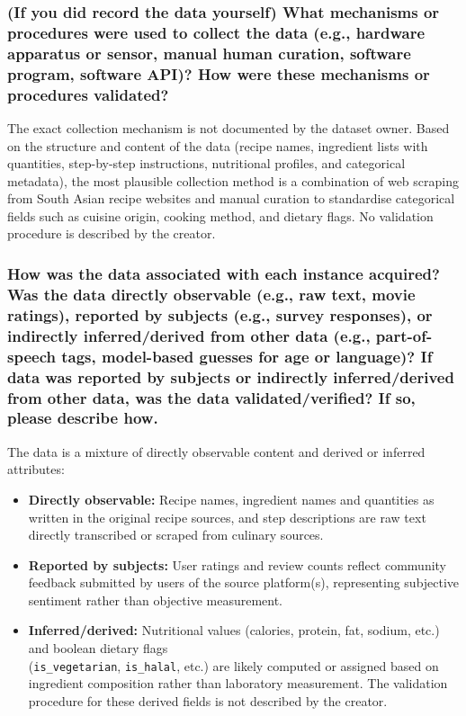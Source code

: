 \documentclass{article}
\newcommand{\question}[1]{#1}
\begin{document}
\question{\subsubsection*{(If you did record the data yourself) What mechanisms or procedures were used to collect the data (e.g., hardware apparatus or sensor, manual human curation, software program, software API)? How were these mechanisms or procedures validated?}}

The exact collection mechanism is not documented by the dataset owner. Based on the structure and content of the data (recipe names, ingredient lists with quantities, step-by-step instructions, nutritional profiles, and categorical metadata), the most plausible collection method is a combination of web scraping from South Asian recipe websites and manual curation to standardise categorical fields such as cuisine origin, cooking method, and dietary flags. No validation procedure is described by the creator.



\question{\subsubsection*{How was the data associated with each instance acquired? Was the data directly observable (e.g., raw text, movie ratings), reported by subjects (e.g., survey responses), or indirectly inferred/derived from other data (e.g., part-of-speech tags, model-based guesses for age or language)? If data was reported by subjects or indirectly inferred/derived from other data, was the data validated/verified? If so, please describe how.}}

The data is a mixture of directly observable content and derived or inferred attributes:

\begin{itemize}
    \item \textbf{Directly observable:} Recipe names, ingredient names and quantities as written in the original recipe sources, and step descriptions are raw text directly transcribed or scraped from culinary sources.
    \item \textbf{Reported by subjects:} User ratings and review counts reflect community feedback submitted by users of the source platform(s), representing subjective sentiment rather than objective measurement.
    \item \textbf{Inferred/derived:} Nutritional values (calories, protein, fat, sodium, etc.) and boolean dietary flags \\(\texttt{is\_vegetarian}, \texttt{is\_halal}, etc.) are likely computed or assigned based on ingredient composition rather than laboratory measurement. The validation procedure for these derived fields is not described by the creator.
\end{itemize}
\end{document}
